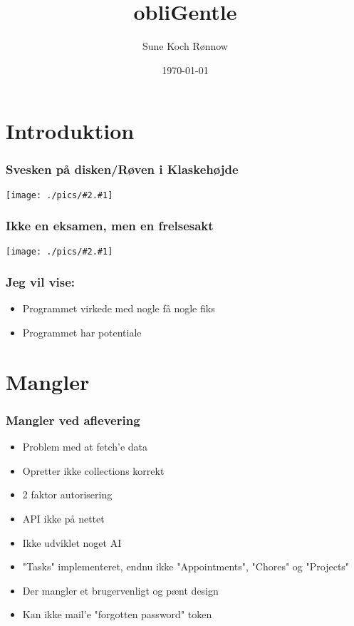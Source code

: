 \documentclass[xcolor={dvipsnames}]{beamer}
\title[Svendeprøve]{obliGentle}
\author{Sune Koch Rønnow}
\institute{Aarhus Tech}
\date{\today}
\newcommand{\pic}[2][png]{
	\begin{center}
	\texttt{[image: ./pics/\#2.\#1]}\\
	\end{center}
}
\begin{document}

\section{Introduktion}

\begin{frame}
\titlepage
\end{frame}

\begin{frame}
\tableofcontents
\end{frame}

\begin{frame}
\frametitle{Svesken på disken/Røven i Klaskehøjde}
\pic{minKode}
\end{frame}

\begin{frame}
\frametitle{Ikke en eksamen, men en frelsesakt}
\pic{buddyJesus}
\end{frame}

\begin{frame}
\frametitle{Jeg vil vise:}
\begin{itemize}
\item Programmet virkede med nogle få nogle fiks
\item Programmet har potentiale
\end{itemize}
\end{frame}

\section{Mangler}

\begin{frame}
\frametitle{Mangler ved aflevering}
\begin{itemize}
\item Problem med at fetch'e data
\item Opretter ikke collections korrekt
\item 2 faktor autorisering
\item API ikke på nettet
\item Ikke udviklet noget AI
\item "Tasks" implementeret, endnu ikke "Appointments", "Chores" og "Projects" 
\item Der mangler et brugervenligt og pænt design
\item Kan ikke mail'e "forgotten password" token
\end{itemize}
\end{frame}
\end{document}
